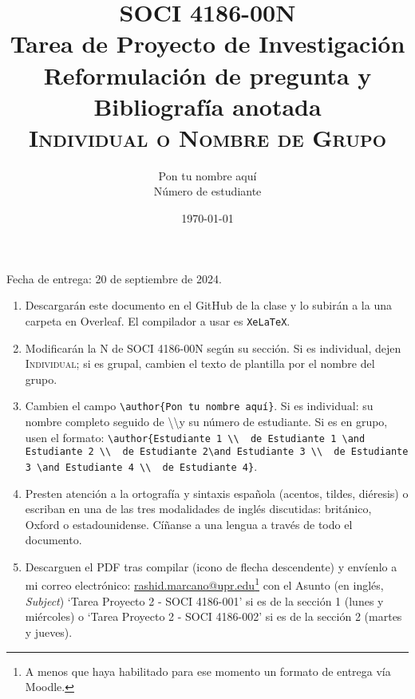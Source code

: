 \documentclass[11pt]{article}
\title{SOCI 4186-00N\\ Tarea de Proyecto de Investigación \textnumero 2 \\ Reformulación de pregunta y Bibliografía anotada \\ \textsc{Individual o Nombre de Grupo}}
\author{Pon tu nombre aquí \\ Número de estudiante}
\date{\today} %
\begin{document}
\singlespacing
\maketitle
Fecha de entrega: 20 de septiembre de 2024.

\begin{enumerate}
    \item Descargarán este documento en el GitHub de la clase y lo subirán a la una carpeta en Overleaf. El compilador a usar es \texttt{XeLaTeX}.
    \item Modificarán la N de SOCI 4186-00N según su sección. Si es individual, dejen \textsc{Individual}; si es grupal, cambien el texto de plantilla por el nombre del grupo.
    \item Cambien el campo \texttt{\textbackslash author\{Pon tu nombre aquí\}}. Si es individual: su nombre completo seguido de \textbackslash\textbackslash y su número de estudiante. Si es en grupo, usen el formato: \texttt{\textbackslash author\{Estudiante 1 \textbackslash\textbackslash \ \textnumero\ de Estudiante 1 \textbackslash and Estudiante 2 \textbackslash\textbackslash \ \textnumero\ de Estudiante 2\textbackslash and Estudiante 3 \textbackslash\textbackslash \ \textnumero\ de Estudiante 3 \textbackslash and Estudiante 4 \textbackslash\textbackslash\ \textnumero\ de Estudiante 4\}}.
    \item Presten atención a la ortografía y sintaxis española (acentos, tildes, diéresis) o escriban en una de las tres modalidades de inglés discutidas: británico, Oxford o estadounidense. Cíñanse a una lengua a través de todo el documento.
    \item Descarguen el PDF tras compilar (icono de flecha descendente) y envíenlo a mi correo electrónico: \href{mailto:rashid.marcano@upr.edu}{rashid.marcano@upr.edu}\footnote{A menos que haya habilitado para ese momento un formato de entrega vía Moodle.} con el Asunto (en inglés, \textit{Subject}) `Tarea Proyecto 2 - SOCI 4186-001' si es de la sección 1 (lunes y miércoles) o `Tarea Proyecto 2 - SOCI 4186-002' si es de la sección 2 (martes y jueves).
\end{enumerate}
\end{document}

